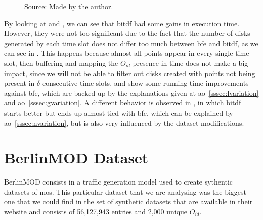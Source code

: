 {\begin{figure}[h!]
\begin{subfigure}[t]{0.48\textwidth}
        \label{fig:trucks_disks}
    \end{subfigure}
    \footnotesize{Source: Made by the author.}
    \label{fig:trucks_results2}
\end{figure}

By looking at  and , we can see that \ac{bitdf} had some gains in
execution time. However, they were not too significant due to the fact that the number of disks generated by each time
slot does not differ too much between \ac{bfe} and \ac{bitdf}, as we can see in . This happens
because almost all points appear in every single time slot, then buffering and mapping the $O_{id}$ presence in time
does not make a big impact, since we will not be able to filter out disks created with points not being present in
$\delta$ consecutive time slots.  and  show some running time
improvements against \ac{bfe}, which are backed up by the explanations given at \ac{ao}~\ref{sssec:lvariation} and
\ac{ao}~\ref{sssec:gvariation}. A different behavior is observed in , in which \ac{bitdf}
starts better but ends up almost tied with \ac{bfe}, which can be explained by \ac{ao}~\ref{sssec:nvariation}, but is
also very influenced by the dataset modifications.

\section{BerlinMOD Dataset}
\label{sec:berlinmod}
BerlinMOD consists in a traffic generation model \citep{berlinmodpaper} used to create sythentic datasets of \acp{mo}.
This particular dataset that we are analysing was the biggest one that we could find in the set of synthetic datasets
that are available in their website \citep{berlinmod} and consists of 56,127,943 entries and 2,000 unique $O_{id}$.

}
